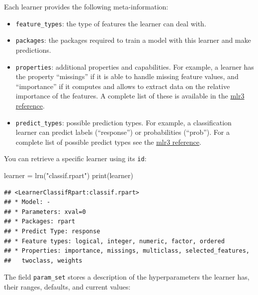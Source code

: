 \documentclass[
]{scrbook}
\newenvironment{Shaded}{\begin{snugshade}}{\end{snugshade}}
\newcommand{\FunctionTok}[1]{\textcolor[rgb]{0.00,0.00,0.00}{#1}}
\newcommand{\NormalTok}[1]{#1}
\newcommand{\OtherTok}[1]{\textcolor[rgb]{0.56,0.35,0.01}{#1}}
\newcommand{\SpecialCharTok}[1]{\textcolor[rgb]{0.00,0.00,0.00}{#1}}
\newcommand{\StringTok}[1]{\textcolor[rgb]{0.31,0.60,0.02}{#1}}
\providecommand{\tightlist}{%
  \setlength{\itemsep}{0pt}\setlength{\parskip}{0pt}}
\renewenvironment{Shaded} {\begin{snugshade}\small} {\end{snugshade}}
\begin{document}
Each learner provides the following meta-information:

\begin{itemize}
\tightlist
\item
  \texttt{feature\_types}: the type of features the learner can deal with.
\item
  \texttt{packages}: the packages required to train a model with this learner and make predictions.
\item
  \texttt{properties}: additional properties and capabilities.
  For example, a learner has the property ``missings'' if it is able to handle missing feature values, and ``importance'' if it computes and allows to extract data on the relative importance of the features.
  A complete list of these is available in the \href{https://mlr3.mlr-org.com/reference/mlr_reflections.html\#examples}{mlr3 reference}.
\item
  \texttt{predict\_types}: possible prediction types. For example, a classification learner can predict labels (``response'') or probabilities (``prob''). For a complete list of possible predict types see the \href{https://mlr3.mlr-org.com/reference/mlr_reflections.html\#examples}{mlr3 reference}.
\end{itemize}

You can retrieve a specific learner using its \texttt{id}:

\begin{Shaded}
\begin{Highlighting}[]
\NormalTok{learner }\OtherTok{=} \FunctionTok{lrn}\NormalTok{(}\StringTok{"classif.rpart"}\NormalTok{)}
\FunctionTok{print}\NormalTok{(learner)}
\end{Highlighting}
\end{Shaded}

\begin{verbatim}
## <LearnerClassifRpart:classif.rpart>
## * Model: -
## * Parameters: xval=0
## * Packages: rpart
## * Predict Type: response
## * Feature types: logical, integer, numeric, factor, ordered
## * Properties: importance, missings, multiclass, selected_features,
##   twoclass, weights
\end{verbatim}

The field \texttt{param\_set} stores a description of the hyperparameters the learner has, their ranges, defaults, and current values:

\begin{Shaded}
\end{Shaded}
\end{document}
